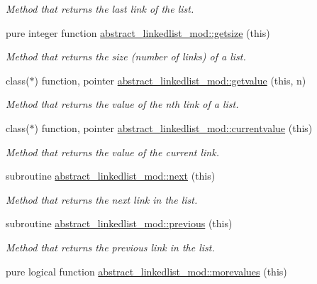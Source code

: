 \begin{DoxyCompactItemize}
\begin{DoxyCompactList}\small\item\em Method that returns the last link of the list. \end{DoxyCompactList}\item 
pure integer function \mbox{\hyperlink{namespaceabstract__linkedlist__mod_ab4e548906863da517d7fedb02931b79f}{abstract\+\_\+linkedlist\+\_\+mod\+::getsize}} (this)
\begin{DoxyCompactList}\small\item\em Method that returns the size (number of links) of a list. \end{DoxyCompactList}\item 
class($\ast$) function, pointer \mbox{\hyperlink{namespaceabstract__linkedlist__mod_a3c3ad627fd9f87da9831c53802975104}{abstract\+\_\+linkedlist\+\_\+mod\+::getvalue}} (this, n)
\begin{DoxyCompactList}\small\item\em Method that returns the value of the nth link of a list. \end{DoxyCompactList}\item 
class($\ast$) function, pointer \mbox{\hyperlink{namespaceabstract__linkedlist__mod_a87a81a4be29c8d4e8d2fb0d02247033b}{abstract\+\_\+linkedlist\+\_\+mod\+::currentvalue}} (this)
\begin{DoxyCompactList}\small\item\em Method that returns the value of the current link. \end{DoxyCompactList}\item 
subroutine \mbox{\hyperlink{namespaceabstract__linkedlist__mod_a576f148096561712d6ddd8c848bc7c4b}{abstract\+\_\+linkedlist\+\_\+mod\+::next}} (this)
\begin{DoxyCompactList}\small\item\em Method that returns the next link in the list. \end{DoxyCompactList}\item 
subroutine \mbox{\hyperlink{namespaceabstract__linkedlist__mod_a0b36d862899c5a40cb98bef4ffd5e2f4}{abstract\+\_\+linkedlist\+\_\+mod\+::previous}} (this)
\begin{DoxyCompactList}\small\item\em Method that returns the previous link in the list. \end{DoxyCompactList}\item 
pure logical function \mbox{\hyperlink{namespaceabstract__linkedlist__mod_a91ec7f6e570a87769ebb3d11b33f577e}{abstract\+\_\+linkedlist\+\_\+mod\+::morevalues}} (this)

\end{DoxyCompactItemize}
